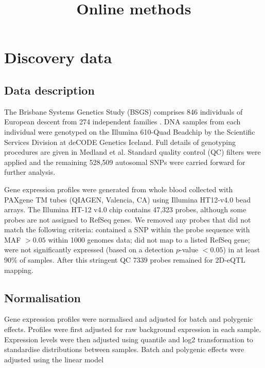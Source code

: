 \documentclass{article}
\title{Online methods}
\date{}
\author{}
\begin{document}
\maketitle


\tableofcontents

\section{Discovery data}

\subsection{Data description}

The Brisbane Systems Genetics Study (BSGS) comprises 846 individuals of European descent from 274 independent families \cite{Powell2012}. DNA samples from each individual were genotyped on the Illumina 610-Quad Beadchip by the Scientific Services Division at deCODE Genetics Iceland. Full details of genotyping procedures are given in Medland et al. \cite{Medland2009} Standard quality control (QC) filters were applied and the remaining 528,509 autosomal SNPs were carried forward for further analysis. 

Gene expression profiles were generated from whole blood collected with PAXgene TM tubes (QIAGEN, Valencia, CA) using Illumina HT12-v4.0 bead arrays. The Illumina HT-12 v4.0 chip contains 47,323 probes, although some probes are not assigned to RefSeq genes. We removed any probes that did not match the following criteria: contained a SNP within the probe sequence with MAF $ > 0.05$ within 1000 genomes data; did not map to a listed RefSeq gene; were not significantly expressed (based on a detection $p$-value $< 0.05$) in at least 90\% of samples. After this stringent QC 7339 probes remained for 2D-eQTL mapping.


\subsection{Normalisation}

Gene expression profiles were normalised and adjusted for batch and polygenic effects. Profiles were first adjusted for raw background expression in each sample. Expression levels were then adjusted using quantile and log2 transformation to standardise distributions between samples. Batch and polygenic effects were adjusted using the linear model
\end{document}
